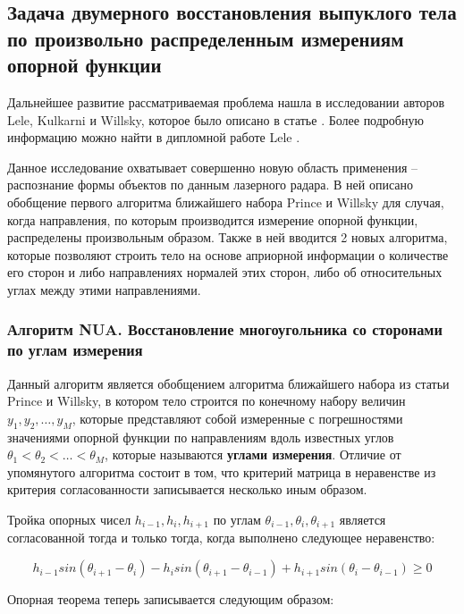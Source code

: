 \documentclass[a4paper, 12pt, titlepage]{article}
\theoremstyle{definition}
\theoremstyle{plain}
\theoremstyle{plain}
\begin{document}
\newpage
\subsection{Задача двумерного восстановления выпуклого тела по произвольно
распределенным измерениям опорной функции}

Дальнейшее развитие рассматриваемая проблема нашла в исследовании авторов Lele,
Kulkarni и Willsky, которое было описано в статье
\cite{journals/josaa/LeleKW92}. Более подробную информацию можно найти в
дипломной работе Lele \cite{thesis/Lele90}.

Данное исследование охватывает совершенно новую область применения --
распознание формы объектов по данным лазерного радара. В ней описано обобщение
первого алгоритма ближайшего набора Prince и Willsky для случая, когда
направления, по которым производится измерение опорной функции, распределены
произвольным образом. Также в ней вводится 2 новых алгоритма, которые позволяют
строить тело на основе априорной информации о количестве его сторон и
либо направлениях нормалей этих сторон, либо об относительных углах между этими
направлениями.

\subsubsection{Алгоритм NUA. Восстановление многоугольника со сторонами по
углам измерения}

Данный алгоритм является обобщением алгоритма ближайшего набора из статьи Prince
и Willsky, в котором тело строится по конечному набору величин
$y_{1}, y_{2}, \ldots, y_{M}$,  которые представляют собой измеренные с
погрешностями значениями опорной функции по направлениям вдоль известных углов
$\theta_{1} < \theta_{2} < \ldots < \theta_{M}$, которые называются
\textbf{углами измерения}. Отличие от упомянутого алгоритма состоит в том, что
критерий матрица в неравенстве из критерия согласованности записывается
несколько иным образом.

Тройка опорных чисел $h_{i - 1}, h_{i}, h_{i + 1}$ по углам $\theta_{i - 1},
\theta_{i}, \theta_{i + 1}$ является согласованной тогда и только тогда, когда
выполнено следующее неравенство:

\begin{equation}
h_{i - 1} sin(\theta_{i + 1} - \theta_{i}) -
h_{i} sin(\theta_{i + 1} - \theta_{i - 1}) +
h_{i + 1} sin(\theta_{i} - \theta_{i - 1}) \geq 0
\end{equation}

Опорная теорема теперь записывается следующим образом:
\end{document}
